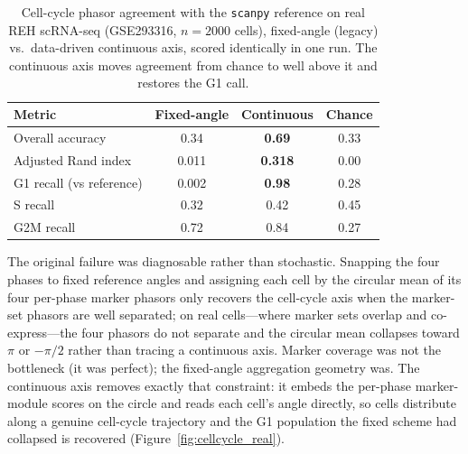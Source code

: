 \documentclass[preprint,12pt,amsmath,amssymb,superscriptaddress,floatfix]{revtex4-2}
\begin{document}
\begin{table}[h]
\centering
\caption{Cell-cycle phasor agreement with the \texttt{scanpy} reference on
real REH scRNA-seq (GSE293316, $n=2000$ cells), fixed-angle (legacy) vs.\
data-driven continuous axis, scored identically in one run. The continuous
axis moves agreement from chance to well above it and restores the G1 call.}
\label{tab:cellcycle_real}
\begin{tabular}{lccc}
\toprule
\textbf{Metric} & \textbf{Fixed-angle} & \textbf{Continuous} & \textbf{Chance} \\
\midrule
Overall accuracy        & 0.34  & \textbf{0.69}  & 0.33 \\
Adjusted Rand index      & 0.011 & \textbf{0.318} & 0.00 \\
G1 recall (vs reference) & 0.002 & \textbf{0.98}  & 0.28 \\
S recall                 & 0.32  & 0.42  & 0.45 \\
G2M recall               & 0.72  & 0.84  & 0.27 \\
\bottomrule
\end{tabular}
\end{table}

The original failure was diagnosable rather than stochastic. Snapping the four
phases to fixed reference angles and assigning each cell by the circular mean
of its four per-phase marker phasors only recovers the cell-cycle axis when the
marker-set phasors are well separated; on real cells---where marker sets
overlap and co-express---the four phasors do not separate and the circular mean
collapses toward $\pi$ or $-\pi/2$ rather than tracing a continuous axis. Marker
coverage was not the bottleneck (it was perfect); the fixed-angle aggregation
geometry was. The continuous axis removes exactly that constraint: it embeds
the per-phase marker-module scores on the circle and reads each cell's angle
directly, so cells distribute along a genuine cell-cycle trajectory and the G1
population the fixed scheme had collapsed is recovered
(Figure~\ref{fig:cellcycle_real}).
\end{document}
